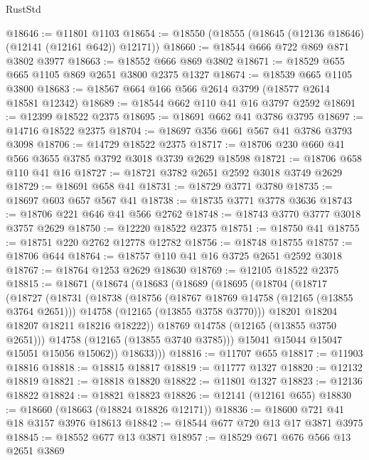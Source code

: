 \begin{lexlean}{RustStd}
\begin{coremodule}
@18646 := @11801 @1103
@18654 := @18550 (@18555 (@18645 (@12136 @18646) (@12141 (@12161 @642)) @12171))
@18660 := @18544 @666 @722 @869 @871 @3802 @3977
@18663 := @18552 @666 @869 @3802
@18671 := @18529 @655 @665 @1105 @869 @2651 @3800 @2375 @1327
@18674 := @18539 @665 @1105 @3800
@18683 := @18567 @664 @166 @566 @2614 @3799 (@18577 @2614 @18581 @12342)
@18689 := @18544 @662 @110 @41 @16 @3797 @2592
@18691 := @12399 @18522 @2375
@18695 := @18691 @662 @41 @3786 @3795
@18697 := @14716 @18522 @2375
@18704 := @18697 @356 @661 @567 @41 @3786 @3793 @3098
@18706 := @14729 @18522 @2375
@18717 := @18706 @230 @660 @41 @566 @3655 @3785 @3792 @3018 @3739 @2629 @18598
@18721 := @18706 @658 @110 @41 @16
@18727 := @18721 @3782 @2651 @2592 @3018 @3749 @2629
@18729 := @18691 @658 @41
@18731 := @18729 @3771 @3780
@18735 := @18697 @603 @657 @567 @41
@18738 := @18735 @3771 @3778 @3636
@18743 := @18706 @221 @646 @41 @566 @2762
@18748 := @18743 @3770 @3777 @3018 @3757 @2629
@18750 := @12220 @18522 @2375
@18751 := @18750 @41
@18755 := @18751 @220 @2762 @12778 @12782
@18756 := @18748 @18755
@18757 := @18706 @644
@18764 := @18757 @110 @41 @16 @3725 @2651 @2592 @3018
@18767 := @18764 @1253 @2629 @18630
@18769 := @12105 @18522 @2375
@18815 := @18671
    (@18674
      (@18683
        (@18689
          (@18695
            (@18704
              (@18717
                (@18727
                  (@18731
                    (@18738
                      (@18756
                        (@18767 @18769 @14758 (@12165 (@13855 @3764 @2651)))
                        @14758
                        (@12165 (@13855 @3758 @3770)))
                      @18201
                      @18204
                      @18207
                      @18211
                      @18216
                      @18222))
                  @18769
                  @14758
                  (@12165 (@13855 @3750 @2651)))
                @14758
                (@12165 (@13855 @3740 @3785)))
              @15041
              @15044
              @15047
              @15051
              @15056
              @15062))
          @18633)))
@18816 := @11707 @655
@18817 := @11903 @18816
@18818 := @18815 @18817
@18819 := @11777 @1327
@18820 := @12132 @18819
@18821 := @18818 @18820
@18822 := @11801 @1327
@18823 := @12136 @18822
@18824 := @18821 @18823
@18826 := @12141 (@12161 @655)
@18830 := @18660 (@18663 (@18824 @18826 @12171))
@18836 := @18600 @721 @41 @18 @3157 @3976 @18613
@18842 := @18544 @677 @720 @13 @17 @3871 @3975
@18845 := @18552 @677 @13 @3871
@18957 := @18529
    @671
    @676
    @566
    @13
    @2651
    @3869

\end{coremodule}
\end{lexlean}

